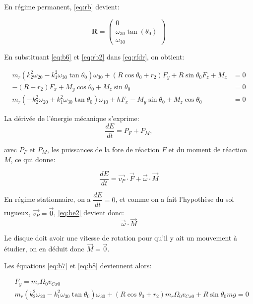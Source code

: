 En régime permanent, \ref{eq:rb} devient:

\begin{equation}
   \mathbf{R}= \begin{pmatrix}
    0  \\
    \omega_{30}\tan(\theta_0) \\
    \omega_{30}     
\end{pmatrix} 
\label{eq:rb2}
\end{equation}

En substituant \ref{eq:b6} et \ref{eq:rb2} dans \ref{eq:rfdr}, on obtient:

\begin{align}
    m_r(k_2^2\omega_{20}-k_1^2\omega_{30} \tan{\theta_0})\omega_{30} +(R\cos{\theta_0}+r_2)F_y + R\sin{\theta_0}F_z + M_x &=0 \nonumber\\
    -(R+r_2)F_x + M_y \cos{\theta_0} +M_z \sin{\theta_0}&=0 \nonumber\\
    m_r(-k_2^2\omega_{20}+k_1^2\omega_{30} \tan{\theta_0})\omega_{10} + hF_x - M_y \sin{\theta_0} +M_z \cos{\theta_0}&=0
  \label{eq:b8}
\end{align}

La dérivée de l'énergie mécanique s'exprime: 
\begin{equation}
    \frac{dE}{dt}=P_F + P_M, 
    \label{eq:be1}
\end{equation}

avec $P_F$ et $P_M$, les puissances de la fore de réaction $F$ et du moment de réaction $M$, ce qui donne:

\begin{equation}
    \frac{dE}{dt}=\vec{v_P} \cdot \vec{F} + \vec{\omega} \cdot \vec{M}
    \label{eq:be2}
\end{equation}

En régime stationnaire, on a $\dfrac{dE}{dt}=0$, et comme on a fait l'hypothèse du sol rugueux, $\vec{v_P}=\vec{0}$, \ref{eq:be2} devient donc: $$\vec{\omega} \cdot \vec{M}$$

Le disque doit avoir une vitesse de rotation pour qu'il y ait un mouvement à étudier, on en déduit donc $\vec{M}=\vec{0}$.

Les équations \ref{eq:b7} et \ref{eq:b8} deviennent alors:

\begin{align}
    &F_y=m_r \Omega_0 v_{Cx0} \nonumber\\
    &m_r(k_2^2\omega_{20}-k_1^2\omega_{30} \tan{\theta_0})\omega_{30} +(R\cos{\theta_0}+r_2)m_r \Omega_0 v_{Cx0} + R\sin{\theta_0}mg =0
  \label{eq:b9}
\end{align}

